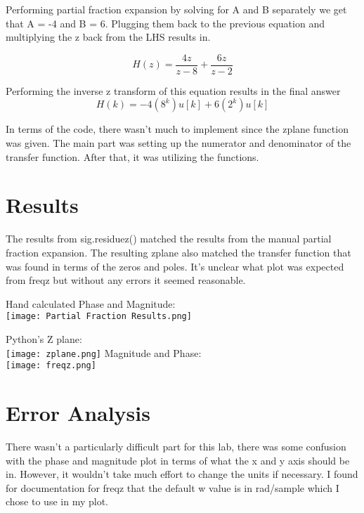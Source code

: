 \documentclass[12pt]{report}
\begin{document}
Performing partial fraction expansion by solving for A and B separately we get that A = -4 and B = 6. Plugging them back to the previous equation and multiplying the z back from the LHS results in.

\begin{equation*}
    H(z) = \frac{4z}{z-8} + \frac{6z}{z-2}
\end{equation*}

Performing the inverse z transform of this equation results in the final answer
\begin{equation*}
    H(k) = -4(8^k)u[k] + 6(2^k)u[k]
\end{equation*}

In terms of the code, there wasn't much to implement since the zplane function was given. The main part was setting up the numerator and denominator of the transfer function. After that, it was utilizing the functions. 

\section{Results}

The results from sig.residuez() matched the results from the manual partial fraction expansion. The resulting zplane also matched the transfer function that was found in terms of the zeros and poles. It's unclear what plot was expected from freqz but without any errors it seemed reasonable. 


Hand calculated Phase and Magnitude:
\\ \texttt{[image: Partial Fraction Results.png]}


Python's Z plane:
\\ \texttt{[image: zplane.png]}
\newpage
Magnitude and Phase:
\\ \texttt{[image: freqz.png]}




\section{Error Analysis}

There wasn't a particularly difficult part for this lab, there was some confusion with the phase and magnitude plot in terms of what the x and y axis should be in. However, it wouldn't take much effort to change the units if necessary. I found for documentation for freqz that the default w value is in rad/sample which I chose to use in my plot. 
\end{document}
